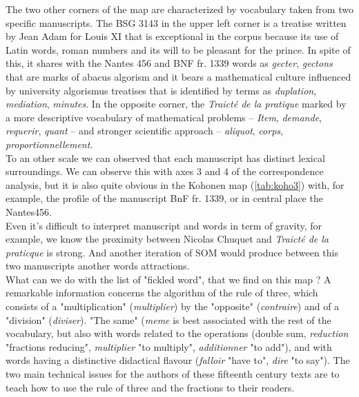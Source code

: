 \documentclass{elsarticle}
\begin{document}
The two other corners of the map are characterized by vocabulary taken from two specific manuscripts. The BSG 3143 in the upper left corner is a treatise written by Jean Adam for Louis XI that is exceptional in the corpus because its use of Latin words, roman numbers and its will to be pleasant for the prince. In spite of this, it shares with the Nantes 456 and BNF fr. 1339 words as \textit{gecter}, \textit{gectons} that are marks of abacus algorism and it bears a mathematical culture influenced by university algorismus treatises that is identified by terms as \textit{duplation}, \textit{mediation}, \textit{minutes}. In the opposite corner, the \textit{Traicté de la pratique} marked by a more descriptive vocabulary of mathematical problems – \textit{Item}, \textit{demande}, \textit{requerir}, \textit{quant} – and stronger scientific approach – \textit{aliquot}, \textit{corps}, \textit{proportionnellement}.\\

To an other scale  we can observed that each manuscript has distinct lexical surroundings. We can observe this with axes 3 and 4 of the correspondence analysis, but it is also quite obvious in the Kohonen map (\ref{tab:koho3}) with, for example, the profile of the manuscript BnF fr. 1339, or in central place the Nantes456.\\

Even it's difficult to interpret manuscript and words in term of gravity, for example, we know the proximity between Nicolas Chuquet and \textit{Traicté de la praticque} is strong. And another iteration of SOM would produce  between this two manuscripts another words attractions.\\


What can we do with the list of "fickled word", that we find on this map ? A remarkable information concerns the algorithm of the rule of three, which consists of a "multiplication" (\textit{multiplier}) by the "opposite" (\textit{contraire}) and of a "division" (\textit{diviser}). "The same" (\textit{meme} is best associated with the rest of the vocabulary, but also with words related to the operations (double sum, \textit{reduction} "fractions reducing", \textit{multiplier} "to multiply", \textit{additionner} "to add"), and with words having a distinctive didactical flavour (\textit{falloir} "have to", \textit{dire} "to say"). The two main technical issues for the authors of these fifteenth century texts are to teach how to use the rule of three and the fractions to their readers.
 
\end{document}
